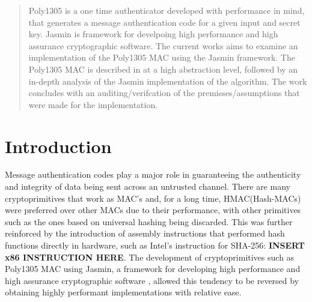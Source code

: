 \documentclass[twocolumn]{article}
\begin{document}

\begin{abstract}
    Poly1305 is a one time authenticator developed with performance in mind, that generates a message authentication code for a given input and secret key. Jasmin is 
    framework for develpoing high performance and high assurance cryptographic software. The current works aims to examine an implementation of the Poly1305 MAC using
    the Jasmin framework. The Poly1305 MAC is described in at a high abstraction level, followed by an in-depth analysis of the Jasmin implementation of the algorithm.
    The work concludes with an auditing/verifcation of the premisses/assumptions that were made for the implementation.
    \end{abstract}

\section{Introduction}
Message authentication codes play a major role in guaranteeing the authenticity and integrity of data being sent across an untrusted channel. There are many 
cryptoprimitives that work as MAC's and, for a long time, HMAC(Hash-MACs) were preferred over other MACs due to their performance, with other primitives such 
as the ones based on universal hashing being discarded. This was further reinforced by the introduction of assembly instructions that performed hash functions 
directly in hardware, such as Intel's instruction for SHA-256: \textbf{INSERT x86 INSTRUCTION HERE}. The development of cryptoprimitives such as Poly1305 MAC 
using Jasmin, a framework for developing high performance and high assurance cryptographic software \cite{jasmin_paper}, allowed this tendency to be reversed 
by obtaining highly performant implementations with relative ease.
\end{document}
